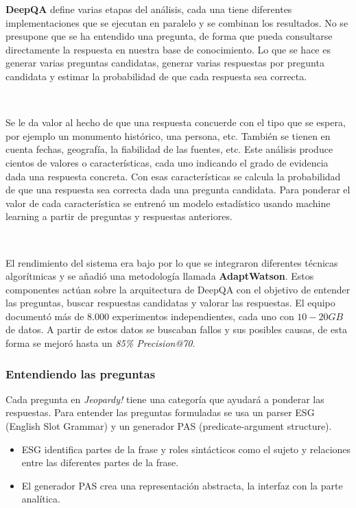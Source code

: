 \documentclass[paper=a4, fontsize=10pt]{scrartcl} %
\numberwithin{equation}{section} %
\numberwithin{figure}{section} %
\numberwithin{table}{section} %
\begin{document}
\textbf{DeepQA} define varias etapas del análisis, cada una tiene diferentes implementaciones que se ejecutan en paralelo y se combinan los resultados.
No se presupone que se ha entendido una pregunta, de forma que pueda consultarse directamente la respuesta en nuestra base de conocimiento.
Lo que se hace es generar varias preguntas candidatas, generar varias respuestas por pregunta candidata y estimar la probabilidad de que cada respuesta sea correcta.

\

Se le da valor al hecho de que una respuesta concuerde con el tipo que se espera, por ejemplo un monumento histórico, una persona, etc.
También se tienen en cuenta fechas, geografía, la fiabilidad de las fuentes, etc.
Este análisis produce cientos de valores o características, cada uno indicando el grado de evidencia dada una respuesta concreta.
Con esas características se calcula la probabilidad de que una respuesta sea correcta dada una pregunta candidata.
Para ponderar el valor de cada característica se entrenó un modelo estadístico usando machine learning a partir de preguntas y respuestas anteriores.

\

El rendimiento del sistema era bajo por lo que se integraron diferentes técnicas algorítmicas y se añadió una metodología llamada \textbf{AdaptWatson}.
Estos componentes actúan sobre la arquitectura de DeepQA con el objetivo de entender las preguntas, buscar respuestas candidatas y valorar las respuestas.
El equipo documentó más de $8.000$ experimentos independientes, cada uno con $10-20GB$ de datos.
A partir de estos datos se buscaban fallos y sus posibles causas, de esta forma se mejoró hasta un \textit{85\% Precision@70}.

\subsubsection{Entendiendo las preguntas}
Cada pregunta en \textit{Jeopardy!} tiene una categoría que ayudará a ponderar las respuestas. %
Para entender las preguntas formuladas se usa un parser ESG (English Slot Grammar) %
y un generador PAS (predicate-argument structure). 

\begin{itemize}
	\item ESG identifica partes de la frase y roles sintácticos como el sujeto y relaciones entre las diferentes partes de la frase.
	\item El generador PAS crea una representación abstracta, la interfaz con la parte analítica.
\end{itemize}
\end{document}
